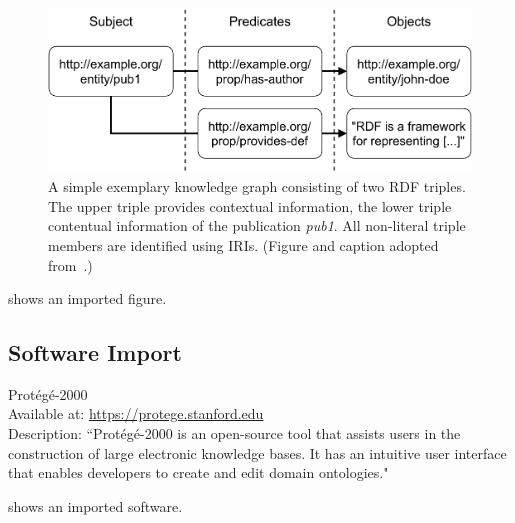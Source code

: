  \begin{figure}[htb!]
 \centering
 \includegraphics[max width=0.7\columnwidth]{./tex/example/figures/triple_example}
 \caption{A simple exemplary knowledge graph consisting of two RDF triples. The upper triple provides contextual information, the lower triple contentual information of the publication \emph{{pub1}}. All non-literal triple members are identified using IRIs. (Figure and caption adopted from~\cite{Martin21}.)}
 \label{fig:contentual-contextual}
 \end{figure}
 shows an imported figure.

\subsection{Software Import}

 \begin{software}
 Prot{\'{e}}g{\'{e}}-2000~\cite{DBLP:conf/amia/NoyCFKTVM03}\\
 Available at: \url{https://protege.stanford.edu}\\
 Description: ``Prot\'{e}g\'{e}-2000 is an open-source tool that assists users in the construction of large electronic knowledge bases. It has an intuitive user interface that enables developers to create and edit domain ontologies."~\cite{DBLP:conf/amia/NoyCFKTVM03}
 \label{software:protege}
 \end{software}
 shows an imported software.



